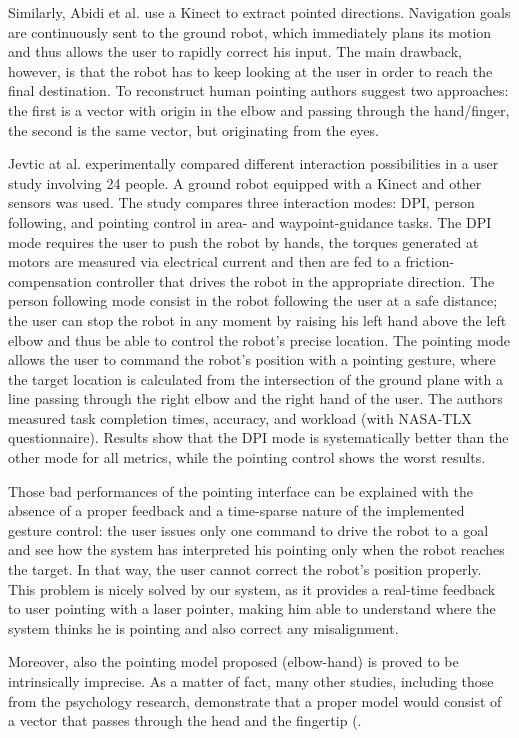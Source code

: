 Similarly, Abidi et al. \cite{Abidi2013} use a Kinect to extract pointed directions. Navigation goals are continuously sent to the ground robot, which immediately plans its motion and thus allows the user to rapidly correct his input. The main drawback, however, is that the robot has to keep looking at the user in order to reach the final destination. To reconstruct human pointing authors suggest two approaches: the first is a vector with origin in the elbow and passing through the hand/finger, the second is the same vector, but originating from the eyes.

Jevtic at al. \cite{Jevtic2015} experimentally compared different interaction possibilities in a user study involving 24 people. A ground robot equipped with a Kinect and other sensors was used. The study compares three interaction modes: \ac{DPI}, person following, and pointing control in area- and waypoint-guidance tasks. The DPI mode requires the user to push the robot by hands, the torques generated at motors are measured via electrical current and then are fed to a friction-compensation controller that drives the robot in the appropriate direction. The person following mode consist in the robot following the user at a safe distance; the user can stop the robot in any moment by raising his left hand above the left elbow and thus be able to control the robot's precise location. The pointing mode allows the user to command the robot's position with a pointing gesture, where the target location is calculated from the intersection of the ground plane with a line passing through the right elbow and the right hand of the user.
The authors measured task completion times, accuracy, and workload (with NASA-TLX questionnaire). Results show that the DPI mode is systematically better than the other mode for all metrics, while the pointing control shows the worst results.

Those bad performances of the pointing interface can be explained with the absence of a proper feedback and a time-sparse nature of the implemented gesture control: the user issues only one command to drive the robot to a goal and see how the system has interpreted his pointing only when the robot reaches the target. In that way, the user cannot correct the robot's position properly. This problem is nicely solved by our system, as it provides a real-time feedback to user pointing with a laser pointer, making him able to understand where the system thinks he is pointing and also correct any misalignment.

Moreover, also the pointing model proposed (elbow-hand) is proved to be intrinsically imprecise. As a matter of fact, many other studies, including those from the psychology research, demonstrate that a proper model would consist of a vector that passes through the head and the fingertip (\cite{Taylor1988,Herbort2016,Abidi2013,Nickel2007,Droeschel2011}. 

